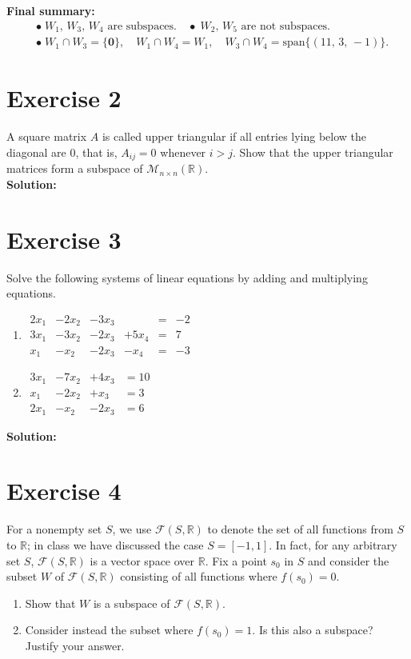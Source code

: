 \documentclass{article}
\begin{document}
\bigskip

\noindent
\textbf{Final summary:}
\[
\begin{aligned}
&\bullet\; W_1,\,W_3,\,W_4 \text{ are subspaces.}
\quad\bullet\; W_2,\,W_5 \text{ are not subspaces.} \\[6pt]
&\bullet\; W_1 \cap W_3 = \{\mathbf{0}\}, 
\quad 
W_1 \cap W_4 = W_1, 
\quad 
W_3 \cap W_4 = \text{span}\{(11,\,3,\, -1)\}.
\end{aligned}
\]

\newpage

\section*{Exercise 2}
A square matrix $A$ is called upper triangular if all entries lying below the diagonal are 0, that is, $A_{ij} = 0$ whenever $i > j$. Show that the upper triangular matrices form a subspace of $\mathcal{M}_{n\times n}(\mathbb{R})$. \\

\textbf{Solution:}
\newpage

\section*{Exercise 3}
Solve the following systems of linear equations by adding and multiplying equations.
\begin{enumerate}[label=(\alph*)]
\item $\begin{aligned}
2x_1&-2x_2&-3x_3& &= &-2 \\
3x_1&-3x_2&-2x_3&+5x_4 &= &7 \\
x_1&-x_2&-2x_3&-x_4 &= &-3
\end{aligned}$

\item $\begin{aligned}
3x_1&-7x_2&+4x_3 &= 10 \\
x_1&-2x_2&+x_3 &= 3 \\
2x_1&-x_2&-2x_3 &= 6
\end{aligned}$
\end{enumerate}

\textbf{Solution:}
\newpage

\section*{Exercise 4}
For a nonempty set $S$, we use $\mathcal{F}(S,\mathbb{R})$ to denote the set of all functions from $S$ to $\mathbb{R}$; in class we have discussed the case $S = [-1,1]$. In fact, for any arbitrary set $S$, $\mathcal{F}(S,\mathbb{R})$ is a vector space over $\mathbb{R}$. Fix a point $s_0$ in $S$ and consider the subset $W$ of $\mathcal{F}(S,\mathbb{R})$ consisting of all functions where $f(s_0) = 0$.
\begin{enumerate}[label=(\alph*)]
\item Show that $W$ is a subspace of $\mathcal{F}(S,\mathbb{R})$.
\item Consider instead the subset where $f(s_0) = 1$. Is this also a subspace? Justify your answer.
\end{enumerate}
\end{document}
